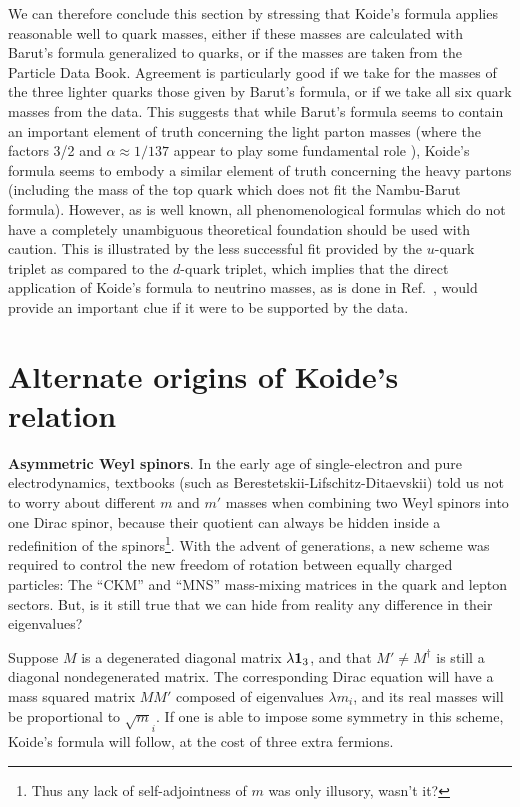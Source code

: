 \documentclass[12pt,a4paper]{article}
\begin{document}
   We can therefore conclude this section by stressing that Koide's formula applies reasonable well to quark masses, either if these masses are calculated with Barut's formula generalized to quarks, or if the masses are taken from the Particle Data Book.  Agreement is particularly good if we take for the masses of the three lighter quarks those given by Barut's formula, or if we take all six quark masses from the data.  This suggests that while Barut's formula seems to contain an important element of truth concerning the light parton masses (where the factors 3/2 and $\alpha \approx 1/137$ appear to play some fundamental role \cite{alfa2}), Koide's formula seems to embody a similar element of truth concerning the heavy partons (including the mass of the top quark which does not fit the Nambu-Barut formula).  However, as is well known, all phenomenological formulas which do not have a completely unambiguous theoretical foundation should be used with caution.  This is illustrated by the less successful fit provided by the $u$-quark triplet as compared to the $d$-quark triplet, which implies that the direct application of Koide's formula to neutrino masses, as is done in Ref.~\cite{newone}, would provide an important clue if it were to be supported by the data.


\section*{Alternate origins of Koide's relation}

{\bf Asymmetric Weyl spinors}. In the early age of single-electron and
pure electrodynamics,
textbooks (such as Berestetskii-Lifschitz-Ditaevskii) told us not to worry about 
different $m$ and $m'$ masses when
combining two Weyl spinors into one Dirac spinor, because their quotient
can always be hidden inside a redefinition of the spinors\footnote{Thus any 
lack of self-adjointness of $m$ was only illusory, wasn't it?}. With the
advent of generations, a new scheme was required to control the new 
freedom of rotation between equally charged particles: The ``CKM'' and ``MNS''
mass-mixing matrices in the quark and lepton sectors. But, is it still true that we can hide from reality any difference in their eigenvalues? 

 Suppose $M$ is a degenerated diagonal matrix $\lambda {\bf 1}_3$, 
and that $M'\neq M^\dagger$ is still a diagonal nondegenerated matrix. The corresponding Dirac 
equation will have a mass squared matrix $MM'$ composed of eigenvalues $\lambda m_i$, and its
real masses will be proportional to $\sqrt m_i$. If one is able to impose some
symmetry in this scheme, Koide's formula will follow, at the cost of three extra
fermions.
\end{document}
